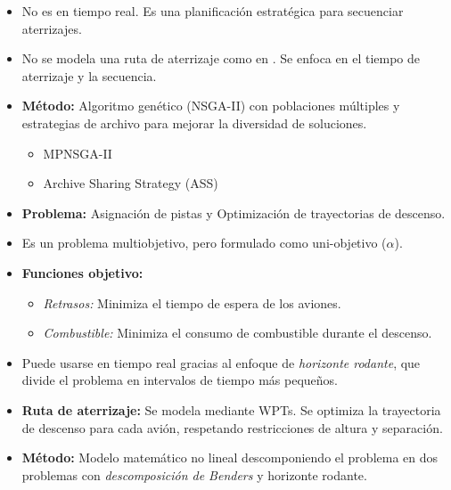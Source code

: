 \begin{frame}{\parencite{shirini_multi-objective_2024}}

    \begin{itemize}
        \item No es en tiempo real. Es una planificación estratégica para secuenciar aterrizajes.
        \item No se modela una ruta de aterrizaje como en \parencite{barea_integrated_2024}. Se enfoca en el tiempo de aterrizaje y la secuencia.
        \item \textbf{Método:} Algoritmo genético (NSGA-II) con poblaciones múltiples y estrategias de archivo para mejorar la diversidad de soluciones.
              \begin{itemize}
                  \item MPNSGA-II
                  \item Archive Sharing Strategy (ASS)
              \end{itemize}
    \end{itemize}

\end{frame}


\begin{frame}{\parencite{barea_integrated_2024}}
    \begin{itemize}

        \item \textbf{Problema:} Asignación de pistas y Optimización de trayectorias de descenso.
        \item Es un problema multiobjetivo, pero formulado como uni-objetivo ($\alpha$).
        \item \textbf{Funciones objetivo:}
              \begin{itemize}
                  \item \textit{Retrasos:} Minimiza el tiempo de espera de los aviones.
                  \item \textit{Combustible:} Minimiza el consumo de combustible durante el descenso.
              \end{itemize}
        \item Puede usarse en tiempo real gracias al enfoque de \textit{horizonte rodante}, que divide el problema en intervalos de tiempo más pequeños.
        \item \textbf{Ruta de aterrizaje:} Se modela mediante WPTs. Se optimiza la trayectoria de descenso para cada avión, respetando restricciones de altura y separación.
        \item \textbf{Método:} Modelo matemático no lineal descomponiendo el problema en dos problemas con \textit{descomposición de Benders} y horizonte rodante.
    \end{itemize}



\end{frame}




